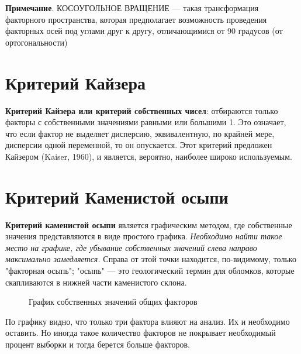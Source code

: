 \documentclass[a4paper, 12pt]{article}
\begin{document}
\textbf{Примечание}. КОСОУГОЛЬНОЕ ВРАЩЕНИЕ --- такая трансформация факторного пространства, которая предполагает возможность проведения факторных осей под углами друг к другу, отличающимися от 90 градусов (от ортогональности)

\section{Критерий Кайзера}
\textbf{Критерий Кайзера или критерий собственных чисел}: отбираются только факторы с собственными значениями равными или большими 1. Это означает, что если фактор не выделяет дисперсию, эквивалентную, по крайней мере, дисперсии одной переменной, то он опускается. Этот критерий предложен Кайзером (Kaiser, 1960), и является, вероятно, наиболее широко используемым.
\section{Критерий Каменистой осыпи}
\textbf{Критерий каменистой осыпи} является графическим методом, где собственные значения представляются в виде простого графика. \textit{Необходимо найти такое место на графике, где убывание собственных значений слева направо максимально замедляется.}  
Справа от этой точки находится, по-видимому, только "факторная осыпь"; "осыпь" --- это геологический термин для обломков, которые скапливаются в нижней части каменистого склона.
 
\begin{figure}[h!]
    \caption{График собственных значений общих факторов}
    \label{ris:image}
    \end{figure}

По графику видно, что только три фактора влияют на анализ. Их и необходимо оставить. Но иногда такое количество факторов не покрывает необходимый процент выборки и тогда берется больше факторов.
\end{document}
